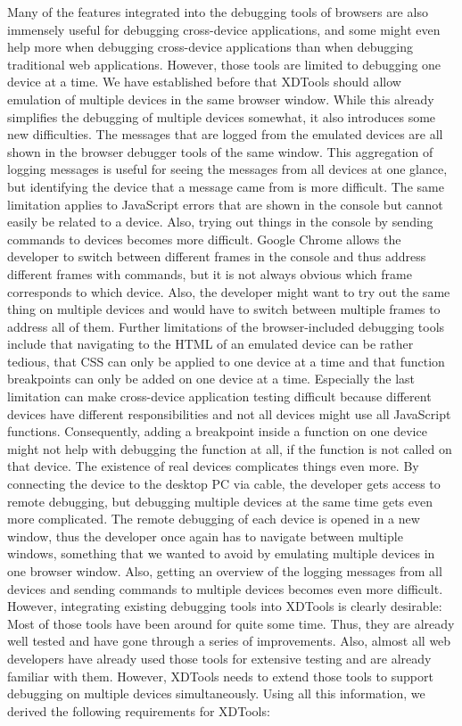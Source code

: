 Many of the features integrated into the debugging tools of browsers are also immensely useful for debugging cross-device applications, and some might even help more when debugging cross-device applications than when debugging traditional web applications. However, those tools are limited to debugging one device at a time. We have established before that XDTools should allow emulation of multiple devices in the same browser window. While this already simplifies the debugging of multiple devices somewhat, it also introduces some new difficulties. The messages that are logged from the emulated devices are all shown in the browser debugger tools of the same window. This aggregation of logging messages is useful for seeing the messages from all devices at one glance, but identifying the device that a message came from is more difficult. The same limitation applies to JavaScript errors that are shown in the console but cannot easily be related to a device. Also, trying out things in the console by sending commands to devices becomes more difficult. Google Chrome allows the developer to switch between different frames in the console and thus address different frames with commands, but it is not always obvious which frame corresponds to which device. Also, the developer might want to try out the same thing on multiple devices and would have to switch between multiple frames to address all of them. Further limitations of the browser-included debugging tools include that navigating to the HTML of an emulated device can be rather tedious, that CSS can only be applied to one device at a time and that function breakpoints can only be added on one device at a time. Especially the last limitation can make cross-device application testing difficult because different devices have different responsibilities and not all devices might use all JavaScript functions. Consequently, adding a breakpoint inside a function on one device might not help with debugging the function at all, if the function is not called on that device. The existence of real devices complicates things even more. By connecting the device to the desktop PC via cable, the developer gets access to remote debugging, but debugging multiple devices at the same time gets even more complicated. The remote debugging of each device is opened in a new window, thus the developer once again has to navigate between multiple windows, something that we wanted to avoid by emulating multiple devices in one browser window. Also, getting an overview of the logging messages from all devices and sending commands to multiple devices becomes even more difficult. However, integrating existing debugging tools into XDTools is clearly desirable: Most of those tools have been around for quite some time. Thus, they are already well tested and have gone through a series of improvements. Also, almost all web developers have already used those tools for extensive testing and are already familiar with them. However, XDTools needs to extend those tools to support debugging on multiple devices simultaneously. Using all this information, we derived the following requirements for XDTools:
